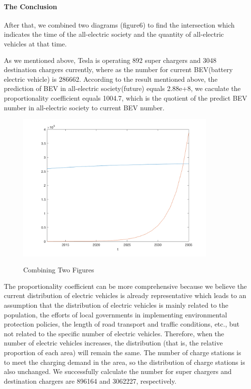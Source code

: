 \documentclass{mcmthesis}
\begin{document}
		\paragraph{The Conclusion}
		After that, we combined two diagrams (figure6) to find the intersection which indicates the time of the all-electric society and the quantity of all-electric vehicles at that time.
		\par
As we mentioned above, Tesla is operating 892 super chargers and 3048 destination chargers currently, where as the number for current BEV(battery electric vehicle) is 286662. According to the result mentioned above, the prediction of BEV in all-electric society(future) equals 2.88e+8, we caculate the proportionality coefficient equals 1004.7, which is the quotient of the predict BEV number in all-electric society to current BEV number.
 \begin{figure}[htbp]
 	\centering
 	\includegraphics[width=10cm]{img/uspredict.png}\\
 	\caption{Combining Two Figures}
 	\label{Figure6}
 \end{figure}

\par

 
The proportionality coefficient can be more comprehensive because we believe the current distribution of electric vehicles is already representative which leads to an assumption that the distribution of electric vehicles is mainly related to the population, the efforts of local governments in implementing environmental protection policies, the length of road transport and traffic conditions, etc., but not related to the specific number of electric vehicles. Therefore, when the number of electric vehicles increases, the distribution (that is, the relative proportion of each area) will remain the same. The number of charge stations is to meet the charging demand in the area, so the distribution of charge stations is also unchanged. We successfully calculate the number for super chargers and destination chargers are 896164 and 3062227, respectively.
\end{document}
